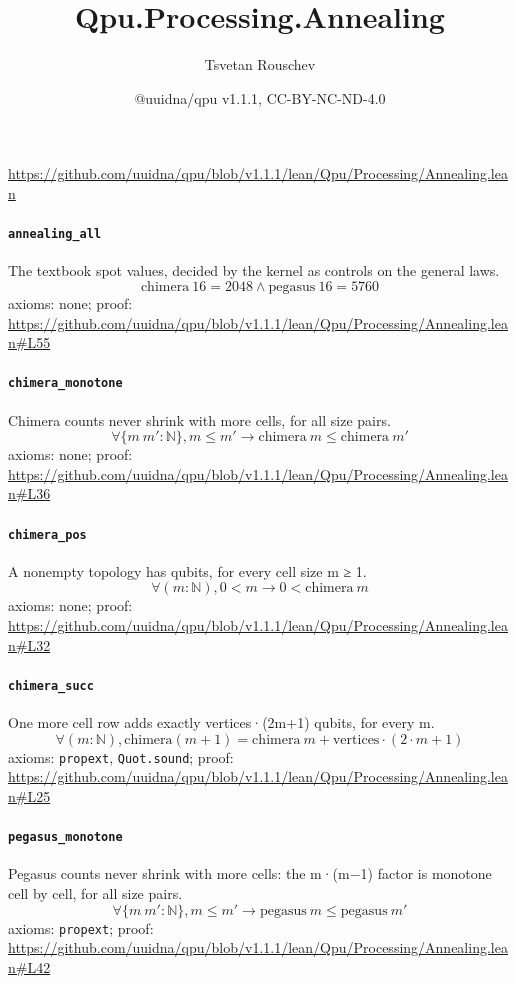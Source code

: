 \documentclass[11pt]{article}
\title{Qpu.Processing.Annealing}
\author{Tsvetan Rouschev}
\date{@uuidna/qpu v1.1.1, CC-BY-NC-ND-4.0}
\begin{document}
\maketitle
\noindent\url{https://github.com/uuidna/qpu/blob/v1.1.1/lean/Qpu/Processing/Annealing.lean}

\paragraph{\texttt{annealing\_all}}
The textbook spot values, decided by the kernel as controls on the general laws.
\[ \mathrm{chimera}\ 16 = 2048 \land \mathrm{pegasus}\ 16 = 5760 \]
\noindent axioms: none; proof: \url{https://github.com/uuidna/qpu/blob/v1.1.1/lean/Qpu/Processing/Annealing.lean\#L55}

\paragraph{\texttt{chimera\_monotone}}
Chimera counts never shrink with more cells, for all size pairs.
\[ \forall \{m\ m' : \mathbb{N}\}, m \le m' \to \mathrm{chimera}\ m \le \mathrm{chimera}\ m' \]
\noindent axioms: none; proof: \url{https://github.com/uuidna/qpu/blob/v1.1.1/lean/Qpu/Processing/Annealing.lean\#L36}

\paragraph{\texttt{chimera\_pos}}
A nonempty topology has qubits, for every cell size m ≥ 1.
\[ \forall (m : \mathbb{N}), 0 < m \to 0 < \mathrm{chimera}\ m \]
\noindent axioms: none; proof: \url{https://github.com/uuidna/qpu/blob/v1.1.1/lean/Qpu/Processing/Annealing.lean\#L32}

\paragraph{\texttt{chimera\_succ}}
One more cell row adds exactly vertices·(2m+1) qubits, for every m.
\[ \forall (m : \mathbb{N}), \mathrm{chimera} (m + 1) = \mathrm{chimera}\ m + \mathrm{vertices} \cdot (2 \cdot m + 1) \]
\noindent axioms: \texttt{propext}, \texttt{Quot.sound}; proof: \url{https://github.com/uuidna/qpu/blob/v1.1.1/lean/Qpu/Processing/Annealing.lean\#L25}

\paragraph{\texttt{pegasus\_monotone}}
Pegasus counts never shrink with more cells: the m·(m−1) factor is monotone cell by cell, for all size pairs.
\[ \forall \{m\ m' : \mathbb{N}\}, m \le m' \to \mathrm{pegasus}\ m \le \mathrm{pegasus}\ m' \]
\noindent axioms: \texttt{propext}; proof: \url{https://github.com/uuidna/qpu/blob/v1.1.1/lean/Qpu/Processing/Annealing.lean\#L42}
\end{document}
